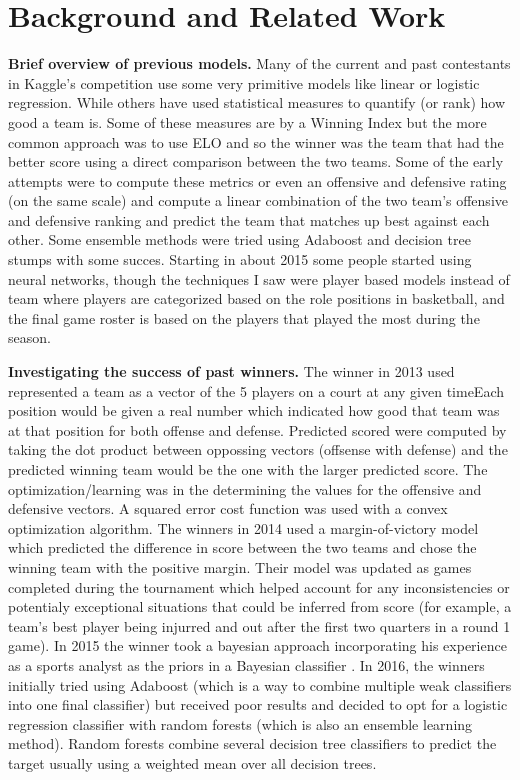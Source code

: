 \documentclass{article} %
\begin{document}
\section{Background and Related Work}
\label{sec:background-related-work}

\textbf{Brief overview of previous models.}
Many of the current and past contestants in Kaggle's competition \citep{kagglecompetition} use some very primitive models like linear or logistic regression.
While others have used statistical measures to quantify (or rank) how good a team is.
Some of these measures are by a Winning Index but the more common approach was to use ELO \citep{elo} and so the winner was the team that had the better score using a direct comparison between the two teams.
Some of the early attempts were to compute these metrics or even an offensive and defensive rating (on the same scale) and compute a linear combination of the two team's offensive and defensive ranking and predict the team that matches up best against each other.
Some ensemble methods were tried using Adaboost and decision tree stumps with some succes.
Starting in about 2015 some people started using neural networks, though the techniques I saw were player based models instead of team where players are categorized based on the role positions in basketball, and the final game roster is based on the players that played the most during the season.

\textbf{Investigating the success of past winners.}
The winner in 2013 used represented a team as a vector of the 5 players on a court at any given timeEach position would be given a real number which indicated how good that team was at that position for both offense and defense.
Predicted scored were computed by taking the dot product between oppossing vectors (offsense with defense) and the predicted winning team would be the one with the larger predicted score.
The optimization/learning was in the determining the values for the offensive and defensive vectors.
A squared error cost function was used with a convex optimization algorithm.
The winners in 2014 used a margin-of-victory model which predicted the difference in score between the two teams and chose the winning team with the positive margin.
Their model was updated as games completed during the tournament which helped account for any inconsistencies or potentialy exceptional situations that could be inferred from score (for example, a team's best player being injurred and out after the first two quarters in a round 1 game).
In 2015 the winner took a bayesian approach incorporating his experience as a sports analyst as the priors in a Bayesian classifier \citep{kaggle2015winner}.
In 2016, the winners initially tried using Adaboost (which is a way to combine multiple weak classifiers into one final classifier) but received poor results \citep{kaggle2016winner} and decided to opt for a logistic regression classifier with random forests (which is also an ensemble learning method).
Random forests combine several decision tree classifiers to predict the target usually using a weighted mean over all decision trees.
\end{document}
